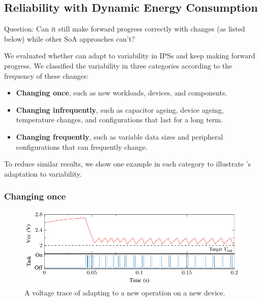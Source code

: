 
\subsection{Reliability with Dynamic Energy Consumption}

Question: Can it still make forward progress correctly with changes (as listed below) while other SoA approaches can't? 

We evaluated whether \nn{} can adapt to variability in IPSs and keep making forward progress.
We classified the variability in three categories according to the frequency of these changes: 
\begin{itemize}
    \item \textbf{Changing once}, such as new workloads, devices, and components.
    \item \textbf{Changing infrequently}, such as capacitor ageing, device ageing, temperature changes, and configurations that last for a long term.
    \item \textbf{Changing frequently}, such as variable data sizes and peripheral configurations that can frequently change. 
\end{itemize}
To reduce similar results, we show one example in each category to illustrate \nn{}'s adaptation to variability. 

\subsubsection{Changing once}

\begin{figure}
    \centering
    \includegraphics[width=\columnwidth]{ch5_optic/figures/v_trace/v_trace.pdf}
    \caption{A voltage trace of \nn{} adapting to a new operation on a new device. }
    \label{fig:v_trace}
\end{figure}

